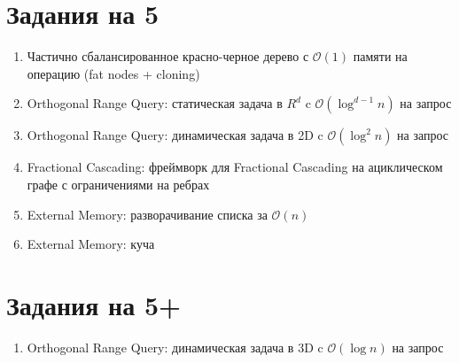 \documentclass[12pt]{article}
\def\O{\mathcal{O}}
\newenvironment{MyList}{
  \begin{enumerate}
  \setlength{\parskip}{-5pt}
  \setlength{\itemsep}{5pt}
}{
  \end{enumerate}
}
\newcommand\Section[1]{\vspace*{-1.5em}\section{#1}}
\begin{document}
\Section{Задания на 5}

\begin{MyList}
\item Частично сбалансированное красно-черное дерево с $\O(1)$ памяти на операцию (fat nodes + cloning)
\item Orthogonal Range Query: статическая задача в $R^d$ c $\O(\log^{d-1}n)$ на запрос
\item Orthogonal Range Query: динамическая задача в 2D c $\O(\log^2 n)$ на запрос
\item Fractional Cascading: фреймворк для Fractional Cascading на ациклическом графе с ограничениями на ребрах
\item External Memory: разворачивание списка за $\O(n)$
\item External Memory: куча
\end{MyList}

\Section{Задания на 5+}

\begin{MyList}
\item Orthogonal Range Query: динамическая задача в 3D c $\O(\log n)$ на запрос
\end{MyList}
\end{document}
